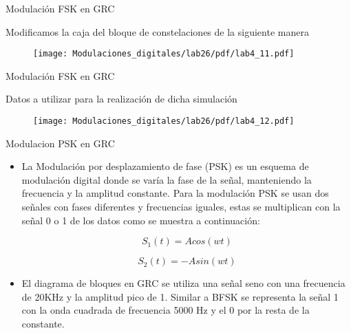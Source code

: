 \begin{frame}{Modulación FSK en GRC}
\begin{flushleft}
Modificamos la caja del bloque de constelaciones de la siguiente manera
\end{flushleft}
\vspace{-0.3cm}
\begin{figure}[H]
\centering
\texttt{[image: Modulaciones\_digitales/lab26/pdf/lab4\_11.pdf]}
\end{figure}
\end{frame}
\begin{frame}{Modulación FSK en GRC}
\begin{flushleft}
Datos a utilizar para la realización de dicha simulación
\end{flushleft}
\vspace{-0.5cm}
\begin{figure}[H]
\centering
\texttt{[image: Modulaciones\_digitales/lab26/pdf/lab4\_12.pdf]}
\end{figure}
\end{frame}
\begin{frame}{Modulacion PSK en GRC}

  \begin{itemize}
  \item {
La Modulación por desplazamiento de fase (PSK) es un esquema de modulación digital donde se varía la fase de la señal, manteniendo la frecuencia y la amplitud constante. Para la modulación PSK se usan dos señales con fases diferentes y frecuencias iguales, estas se multiplican con la señal 0 o 1 de los datos como se muestra a continuación:

\begin{equation*}
S_{1}(t) = Acos(wt)
\end{equation*}

\begin{equation*}
S_{2}(t) = -Asin(wt)
\end{equation*}

  }
  \item {
El diagrama de bloques en GRC se utiliza una señal seno con una frecuencia de 20KHz y la amplitud pico de 1. Similar a BFSK se representa la señal 1 con la onda cuadrada de frecuencia 5000 Hz y el 0 por la resta de la constante\cite{Conferencia2015}. 
  }
  \end{itemize}
\end{frame}

